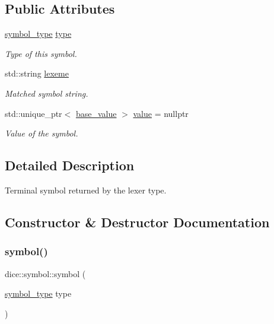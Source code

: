 \subsection*{Public Attributes}
\begin{DoxyCompactItemize}
\item 
\mbox{\label{structdice_1_1symbol_a3bb3109342d99a01c7534c00877857db}} 
\mbox{\hyperlink{symbols_8hpp_ab0295a855bb7eadc138abd6993af3aea}{symbol\+\_\+type}} \mbox{\hyperlink{structdice_1_1symbol_a3bb3109342d99a01c7534c00877857db}{type}}
\begin{DoxyCompactList}\small\item\em Type of this symbol. \end{DoxyCompactList}\item 
std\+::string \mbox{\hyperlink{structdice_1_1symbol_abef11b61a11ced6140a6e1626bce0350}{lexeme}}
\begin{DoxyCompactList}\small\item\em Matched symbol string. \end{DoxyCompactList}\item 
std\+::unique\+\_\+ptr$<$ \mbox{\hyperlink{classdice_1_1base__value}{base\+\_\+value}} $>$ \mbox{\hyperlink{structdice_1_1symbol_a9575fe2bdb23550a1cbd1cb0bb0d1c4b}{value}} = nullptr
\begin{DoxyCompactList}\small\item\em Value of the symbol. \end{DoxyCompactList}\end{DoxyCompactItemize}


\subsection{Detailed Description}
Terminal symbol returned by the lexer type. 



\subsection{Constructor \& Destructor Documentation}
\mbox{\label{structdice_1_1symbol_a4d35cdd398636ca61822f3c024ed122c}} 
\subsubsection{\texorpdfstring{symbol()}{symbol()}\hspace{0.1cm}{\footnotesize\ttfamily [1/3]}}
{\footnotesize\ttfamily dice\+::symbol\+::symbol (\begin{DoxyParamCaption}\item[{\mbox{\hyperlink{symbols_8hpp_ab0295a855bb7eadc138abd6993af3aea}{symbol\+\_\+type}}}]{type }\end{DoxyParamCaption})\hspace{0.3cm}{\ttfamily [inline]}}



